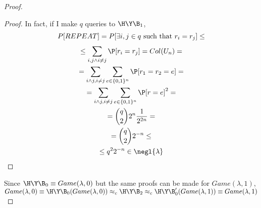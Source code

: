\begin{proof}
\begin{proof}
In fact, if I make $q$ queries to $\H\Y\B_{1}$, 
\begin{gather*}
P[REPEAT]=P[ \exists i, j \in q \text{ such that } r_{i}=r_{j}] \leq \\
\leq \sum_{i,j \wedge i \not= j}^{} \P [ r_{i}=r_{j} ]   = Col(U_{n}) = \\
= \sum_{i \wedge j, i \not= j} \sum_{e \in \{0,1\}^{n}} \P [ r_{1}=r_{2}=e ]  = \\
=\sum_{i \wedge j, i \not= j} \sum_{e \in \{0,1\}^{n}} \P[ r=e ]^{2}  = \\
= {q \choose 2} 2^{n} \frac{1}{2^{2n}} = \\
={q\choose 2} 2^{-n} \leq \\
\leq q^{2}2^{-n} \in \negl{\lambda} 
\end{gather*} 
\end{proof}

Since $\H\Y\B_{0} \equiv Game(\lambda, 0)$ but the same proofs can be made for
$Game(\lambda, 1)$,  
$ Game(\lambda, 0) \equiv \H\Y\B_{0}(Game(\lambda, 0)) \approx_{c} \H\Y\B_{2} \approx_{c} 
\H\Y\B'_{0}(Game(\lambda,1)) \equiv Game(\lambda, 1)$
\end{proof}

